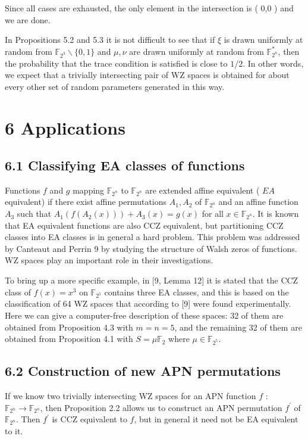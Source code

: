 \documentclass[10pt]{article}
\begin{document}
Since all cases are exhausted, the only element in the intersection is ( 0,0 ) and we are done.

In Propositions 5.2 and 5.3 it is not difficult to see that if $\xi$ is drawn uniformly at random from $\mathbb{F}_{2^{3}} \backslash\{0,1\}$ and $\mu, \nu$ are drawn uniformly at random from $\mathbb{F}_{2^{n}}^{*}$, then the probability that the trace condition is satisfied is close to $1 / 2$. In other words, we expect that a trivially intersecting pair of WZ spaces is obtained for about every other set of random parameters generated in this way.

\section*{6 Applications}
\subsection*{6.1 Classifying EA classes of functions}
Functions $f$ and $g$ mapping $\mathbb{F}_{2^{n}}$ to $\mathbb{F}_{2^{n}}$ are extended affine equivalent ( $E A$ equivalent) if there exist affine permutations $A_{1}, A_{2}$ of $\mathbb{F}_{2^{n}}$ and an affine function $A_{3}$ such that $A_{1}\left(f\left(A_{2}(x)\right)\right)+A_{3}(x)=g(x)$ for all $x \in \mathbb{F}_{2^{n}}$. It is known that EA equivalent functions are also CCZ equivalent, but partitioning CCZ classes into EA classes is in general a hard problem. This problem was addressed by Canteaut and Perrin 9 by studying the structure of Walsh zeros of functions. WZ spaces play an important role in their investigations.

To bring up a more specific example, in [9, Lemma 12] it is stated that the CCZ class of $f(x)=x^{3}$ on $\mathbb{F}_{2^{5}}$ contains three EA classes, and this is based on the classification of 64 WZ spaces that according to [9] were found experimentally. Here we can give a computer-free description of these spaces: 32 of them are obtained from Proposition 4.3 with $m=n=5$, and the remaining 32 of them are obtained from Proposition 4.1 with $S=\mu \mathbb{F}_{2}$ where $\mu \in \mathbb{F}_{2^{5}}$.

\subsection*{6.2 Construction of new APN permutations}
If we know two trivially intersecting WZ spaces for an APN function $f$ : $\mathbb{F}_{2^{n}} \rightarrow \mathbb{F}_{2^{n}}$, then Proposition 2.2 allows us to construct an APN permutation $f^{\prime}$ of $\mathbb{F}_{2^{n}}$. Then $f^{\prime}$ is CCZ equivalent to $f$, but in general it need not be EA equivalent to it.
\end{document}

